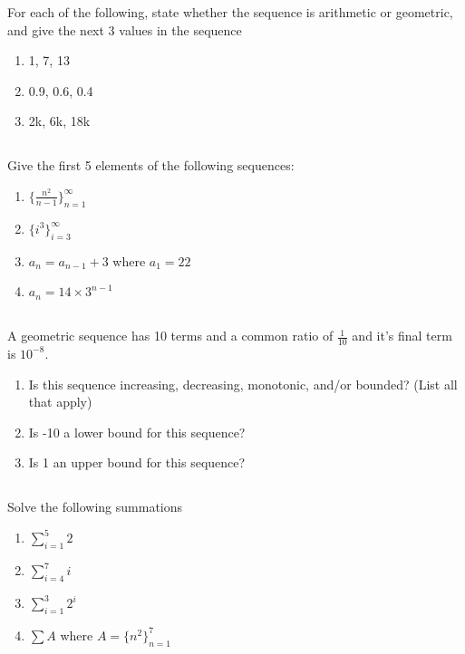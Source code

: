 \documentclass[twocolumn]{article}
\newcommand\mrk[1]{}
\begin{document}
    For each of the following, state whether the sequence is arithmetic or geometric, and give the next 3 values in the sequence

    \begin{enumerate}
        \item 1, 7, 13 \mrk{1}
        \item 0.9, 0.6, 0.4 \mrk{1}
        \item 2k, 6k, 18k \mrk{1}
    \end{enumerate}

\subsection{}

    Give the first 5 elements of the following sequences:

    \begin{enumerate}
        \item $ \{ \frac{n^2}{n-1} \}^\infty_{n=1} $ \mrk{1}
        \item $ \{ i^3 \}^\infty_{i=3} $ \mrk{1}
        \item $ a_n = a_{n-1} + 3 $ where $a_1 = 22$ \mrk{1}
        \item $ a_n = 14 \times 3^{n-1} $ \mrk{1}
    \end{enumerate}

\subsection{}

    A geometric sequence has 10 terms and a common ratio of $\frac{1}{10}$ and it's final term is ${10^{-8}}$.

    \begin{enumerate}
        \item Is this sequence increasing, decreasing, monotonic, and/or bounded? (List all that apply) \mrk{1}
        \item Is -10 a lower bound for this sequence? \mrk{1}
        \item Is 1 an upper bound for this sequence? \mrk{1}
    \end{enumerate}

\subsection{}

    Solve the following summations

    \begin{enumerate}
        \item $ \sum_{i=1}^{5} 2 $ \mrk{1}
        \item $ \sum_{i=4}^{7} i $ \mrk{1}
        \item $ \sum_{i=1}^{3} 2^i $ \mrk{1}
        \item $ \sum A $ where $ A = \{ n^2 \}^{7}_{n=1} $ \mrk{1}
    \end{enumerate}
\end{document}
